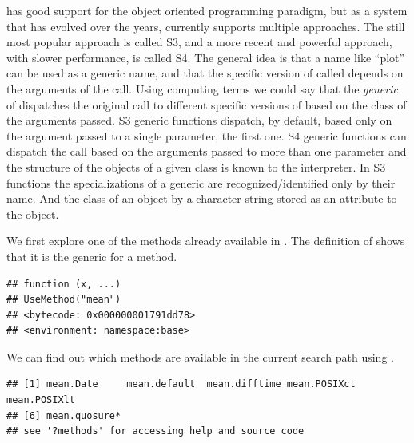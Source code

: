 \documentclass[krantz2]{krantz}\usepackage{knitr}%
\begin{document}
\Rlang has good support for the object oriented programming paradigm, but as a system that has evolved over the years, currently \Rlang supports multiple approaches. The still most popular approach is called S3, and a more recent and powerful approach, with slower performance, is called S4. The general idea is that a name like ``plot'' can be used as a generic name, and that the specific version of  called depends on the arguments of the call. Using computing terms we could say that the \emph{generic} of  dispatches the original call to different specific versions of  based on the class of the arguments passed. S3 generic functions dispatch, by default, based only on the argument passed to a single parameter, the first one. S4 generic functions can dispatch the call based on the arguments passed to more than one parameter and the structure of the objects of a given class is known to the interpreter. In S3 functions the specializations of a generic are recognized/identified only by their name. And the class of an object by a character string stored as an attribute to the object.

We first explore one of the methods already available in \Rlang. The definition of  shows that it is the generic for a method.

\begin{knitrout}\footnotesize
{}\color{fgcolor}\begin{kframe}
\begin{alltt}
\end{alltt}
\begin{verbatim}
## function (x, ...) 
## UseMethod("mean")
## <bytecode: 0x000000001791dd78>
## <environment: namespace:base>
\end{verbatim}
\end{kframe}
\end{knitrout}

We can find out which methods are available in the current search path using .

\begin{knitrout}\footnotesize
{}\color{fgcolor}\begin{kframe}
\begin{alltt}
\end{alltt}
\begin{verbatim}
## [1] mean.Date     mean.default  mean.difftime mean.POSIXct  mean.POSIXlt 
## [6] mean.quosure*
## see '?methods' for accessing help and source code
\end{verbatim}
\end{kframe}
\end{knitrout}
\end{document}
